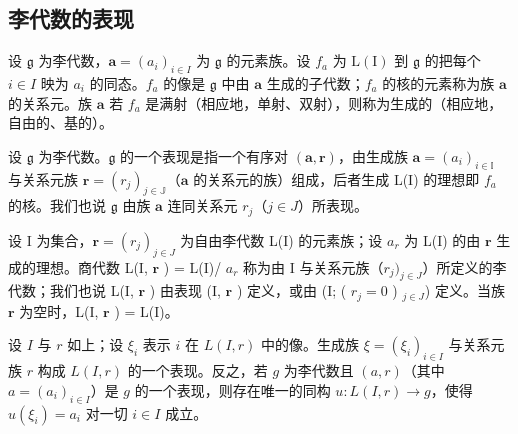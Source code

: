 \subsection{李代数的表现}

设 \(\mathfrak{g}\) 为李代数，\(\pmb{a} = (a_i)_{i\in I}\) 为 \(\mathfrak{g}\) 的元素族。设 \(f_{a}\) 为 \(\mathrm{L(I)}\) 到 \(\mathfrak{g}\) 的把每个 \(i\in I\) 映为 \(a_{i}\) 的同态。\(f_{a}\) 的像是 \(\mathfrak{g}\) 中由 \(\pmb{a}\) 生成的子代数；\(f_{a}\) 的核的元素称为族 \(\pmb{a}\) 的关系元。族 \(\pmb{a}\) 若 \(f_{a}\) 是满射（相应地，单射、双射），则称为生成的（相应地，自由的、基的）。

设 \(\mathfrak{g}\) 为李代数。\(\mathfrak{g}\) 的一个表现是指一个有序对 \((\boldsymbol{a},\boldsymbol{r})\)，由生成族 \(\boldsymbol{a} = (a_{i})_{i\in \mathbb{I}}\) 与关系元族 \(\boldsymbol{r} = (r_j)_{j\in \mathbb{J}}\)（\(\boldsymbol{a}\) 的关系元的族）组成，后者生成 L(I) 的理想即 \(f_{a}\) 的核。我们也说 \(\mathfrak{g}\) 由族 \(\boldsymbol{a}\) 连同关系元 \(r_j\)（\(j\in J\)）所表现。

设 I 为集合，\(\pmb{r} = (r_j)_{j \in J}\) 为自由李代数 L(I) 的元素族；设 \(a_r\) 为 L(I) 的由 \(\pmb{r}\) 生成的理想。商代数 L(I, \(\pmb{r}\) ) = L(I)/ \(a_r\) 称为由 I 与关系元族（\(r_j)_{j \in J}\)）所定义的李代数；我们也说 L(I, \(\pmb{r}\) ) 由表现 (I, \(\pmb{r}\) ) 定义，或由 (I; ( \(r_j = 0\) ) \(_{j \in J}\)) 定义。当族 \(\pmb{r}\) 为空时，L(I, \(\pmb{r}\) ) = L(I)。

设 \(I\) 与 \(r\) 如上；设 \(\xi_i\) 表示 \(i\) 在 \(L(I, r)\) 中的像。生成族 \(\xi = (\xi_i)_{i \in I}\) 与关系元族 \(r\) 构成 \(L(I, r)\) 的一个表现。反之，若 \(g\) 为李代数且 \((a, r)\)（其中 \(a = (a_i)_{i \in I}\)）是 \(g\) 的一个表现，则存在唯一的同构 \(u: L(I, r) \to g\)，使得 \(u(\xi_i) = a_i\) 对一切 \(i \in I\) 成立。

